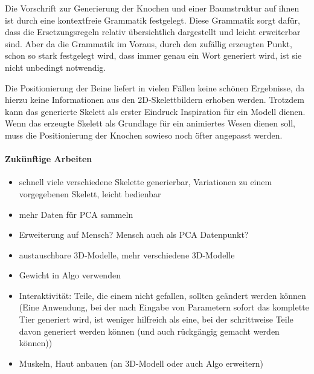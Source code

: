 Die Vorschrift zur Generierung der Knochen und einer Baumstruktur auf ihnen ist durch eine kontextfreie Grammatik festgelegt. Diese Grammatik sorgt dafür, dass die Ersetzungsregeln relativ übersichtlich dargestellt und leicht erweiterbar sind. Aber da die Grammatik im Voraus, durch den zufällig erzeugten Punkt, schon so stark festgelegt wird, dass immer genau ein Wort generiert wird, ist sie nicht unbedingt notwendig.

Die Positionierung der Beine liefert in vielen Fällen keine schönen Ergebnisse, da hierzu keine Informationen aus den 2D-Skelettbildern erhoben werden. Trotzdem kann das generierte Skelett als erster Eindruck \bzw Inspiration für ein Modell dienen. Wenn das erzeugte Skelett als Grundlage für ein animiertes Wesen dienen soll, muss die Positionierung der Knochen sowieso noch öfter angepasst werden.


\paragraph{Zukünftige Arbeiten}





\begin{itemize}
 \item schnell viele verschiedene Skelette generierbar, Variationen zu einem vorgegebenen Skelett, leicht bedienbar

 \item mehr Daten für PCA sammeln
 \item Erweiterung auf Mensch? Mensch auch als PCA Datenpunkt?
 \item austauschbare 3D-Modelle,  mehr verschiedene 3D-Modelle
 \item Gewicht in Algo verwenden
 
 \item Interaktivität: Teile, die einem nicht gefallen, sollten geändert werden können (Eine Anwendung, bei der nach Eingabe von Parametern sofort das komplette Tier generiert wird, ist weniger hilfreich als eine, bei der schrittweise Teile davon generiert werden können (und auch rückgängig gemacht werden können))
 
 \item Muskeln, Haut \etc anbauen (an 3D-Modell oder auch Algo erweitern)
\end{itemize}


